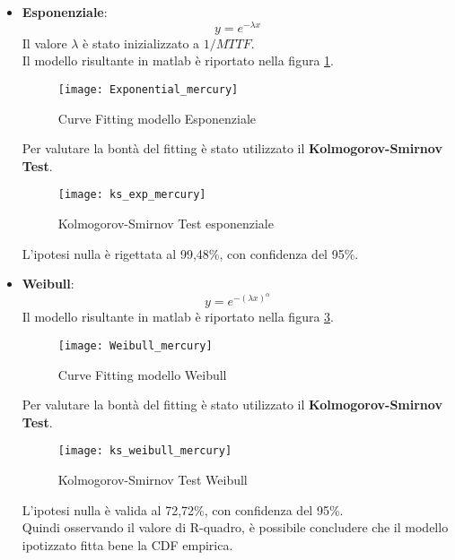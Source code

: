 \begin{itemize}
  \item \textbf{Esponenziale}:
  $$ y = e^{- \lambda  x} $$
  Il valore $\lambda$ è stato inizializzato a $1/MTTF$.\\
  Il modello risultante in matlab è riportato nella figura \ref{ffda_Exponential_mercury}.\\

  \begin{figure}[!htbp]
    \centering
    \texttt{[image: Exponential\_mercury]}
    \caption{Curve Fitting modello Esponenziale}
    \label{ffda_Exponential_mercury}
  \end{figure}

  Per valutare la bontà del fitting è stato utilizzato il \textbf{Kolmogorov-Smirnov Test}.\\

  \begin{figure}[!htbp]
    \centering
    \texttt{[image: ks\_exp\_mercury]}
    \caption{Kolmogorov-Smirnov Test esponenziale}
    \label{ffda_ks_exp_mercury}
  \end{figure}

  L'ipotesi nulla è rigettata al 99,48\%, con confidenza del 95\%.

  \clearpage

  \item \textbf{Weibull}:
  $$ y = e^{- (\lambda x)^\alpha} $$
  Il modello risultante in matlab è riportato nella figura \ref{ffda_Weibull_mercury}.\\
  \begin{figure}[!htbp]
    \texttt{[image: Weibull\_mercury]}
    \caption{Curve Fitting modello Weibull}
    \label{ffda_Weibull_mercury}
  \end{figure}

  Per valutare la bontà del fitting è stato utilizzato il \textbf{Kolmogorov-Smirnov Test}.\\

  \begin{figure}[!htbp]
    \centering
    \texttt{[image: ks\_weibull\_mercury]}
    \caption{Kolmogorov-Smirnov Test Weibull}
    \label{ffda_ks_weibull_mercury}
  \end{figure}

  L'ipotesi nulla è valida al 72,72\%, con confidenza del 95\%.\\
  Quindi osservando il valore di R-quadro, è possibile concludere che il
  modello ipotizzato fitta bene la CDF empirica.\\


\end{itemize}
